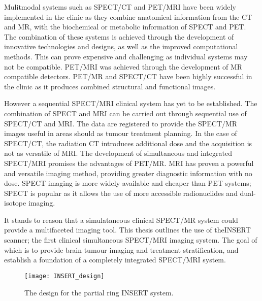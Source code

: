 Mulitmodal systems such as \acrlong{SPECT/CT} and \acrlong{PET/MRI} have been widely implemented in the clinic as they combine anatomical information from the \acrshort{CT} and \acrshort{MR}, with the biochemical or metabolic information of \acrshort{SPECT} and \acrshort{PET}. The combination of these systems is achieved through the development of innovative technologies and designs, as well as the improved computational methods. This can prove expensive and challenging as individual systems may not be compatible. \acrshort{PET/MRI} was achieved through the development of \acrshort{MR} compatible detectors. \acrshort{PET/MR} and \acrshort{SPECT/CT} have been highly successful in the clinic as it produces combined structural and functional images. 

However a sequential \acrshort{SPECT/MRI} clinical system has yet to be established. The combination of \acrshort{SPECT} and \acrshort{MRI} can be carried out through sequential use of \acrshort{SPECT/CT} and \acrshort{MRI}. The data are registered to provide the \acrshort{SPECT/MR} images useful in areas should as tumour treatment planning. In the case of \acrshort{SPECT/CT}, the radiation \acrshort{CT} introduces additional dose and the acquisition is not as versatile of \acrshort{MRI}. The development of simultaneous and integrated \acrshort{SPECT/MRI} promises the advantages of \acrshort{PET/MR}. \acrshort{MRI} has proven a powerful and versatile imaging method, providing greater diagnostic information with no dose. \acrshort{SPECT} imaging is more widely available and cheaper than \acrshort{PET} systems; \acrshort{SPECT} is popular as it allows the use of more accessible radionuclides and dual-isotope imaging.

It stands to reason that a simulataneous clinical \acrshort{SPECT/MR} system could provide a multifaceted imaging tool. This thesis outlines the use of the\acrshort{INSERT} scanner; the first clinical simultaneous \acrshort{SPECT/MRI} imaging system. The goal of which is to provide brain tumour imaging and treatment stratification, and establish a foundation of a completely integrated \acrshort{SPECT/MRI} system. 

\begin{figure}[htp]
    \centering
    \texttt{[image: INSERT\_design]} %
    \caption{The design for the partial ring INSERT system.} \label{fig:INSERT}
\end{figure}

